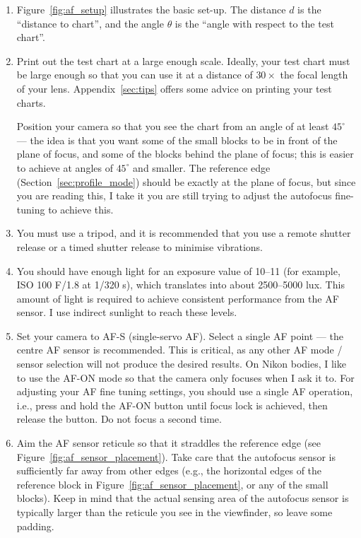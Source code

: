 \documentclass[a4paper]{article}
\begin{document}
\begin{enumerate}
    \item Figure~\ref{fig:af_setup} illustrates the basic set-up. The
distance $d$ is the ``distance to chart'', and the angle $\theta$ is the
``angle with respect to the test chart''.
    \item Print out the test chart at a large enough scale. Ideally, your
test chart must be large enough so that you can use it at a distance of
$30\times$ the focal length of your lens. Appendix~\ref{sec:tips} offers
some advice on printing your test charts.

Position your camera so that you see the chart from an angle of at least $45^\circ$ --- the idea is that you
want some of the small blocks to be in front of the plane of focus, and some
of the blocks behind the plane of focus; this is easier to achieve at angles
of $45^\circ$ and smaller. The reference edge (Section~\ref{sec:profile_mode}) should be
exactly at the plane of focus, but since you are reading this, I take it you
are still trying to adjust the autofocus fine-tuning to achieve this.

  \item You must use a tripod, and it is recommended that you use a remote
shutter release or a timed shutter release to minimise vibrations.

   \item You should have enough
light for an exposure value of 10--11 (for example, ISO 100 F/1.8 at 1/320
s), which translates into about 2500--5000 lux. This amount of light is 
required to achieve consistent performance from
the AF sensor. I use indirect sunlight to reach these levels.

    \item Set your camera to AF-S (single-servo AF). Select a single AF
point --- the centre AF sensor is recommended. This is critical, as any
other AF mode / sensor selection will not produce the desired results.
On Nikon bodies, I like
to use the AF-ON mode so that the camera only focuses when I ask it to. For
adjusting your AF fine tuning settings, you should use a single AF
operation, i.e., press and hold the AF-ON button until focus lock is
achieved, then release the button. Do not focus a second time.

    \item Aim the AF sensor reticule so that it straddles the reference edge
(see Figure~\ref{fig:af_sensor_placement}). Take care that the autofocus sensor
is sufficiently far away from other edges (e.g., the horizontal edges of the
reference block in Figure~\ref{fig:af_sensor_placement}, or any of the small
blocks). Keep in mind that the actual sensing area of the autofocus sensor
is typically larger than the reticule you see in the viewfinder, so leave
some padding.


\end{enumerate}
\end{document}
